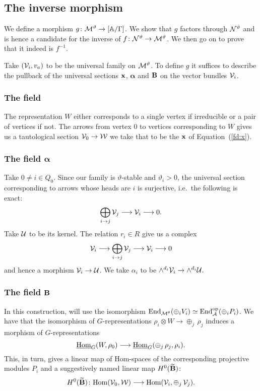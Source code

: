 \documentclass{amsart}
\newcommand{\balpha}{\boldsymbol{\alpha}}
\theoremstyle{definition}
\begin{document}
\subsection{The inverse morphism}

We define a morphism  $g \colon \mathcal{M}^\vartheta \rightarrow [\mathbb{A}/\Gamma]$.
We show that $g$ factors through $\mathcal{N}^\vartheta$ and is hence a candidate for the inverse of $f \colon \mathcal{N}^\vartheta \rightarrow \mathcal{M}^\vartheta$.
We then go on to prove that it indeed is $f^{-1}$.

Take $(\mathcal{V}_i, v_a)$ to be the universal family on $\mathcal{M}^\vartheta$.
To define $g$ it suffices to describe the pullback of the universal sections $\mathbf{x}$, $\balpha$ and $\mathbf{B}$ on the vector bundles $\mathcal{V}_i$.

\subsubsection{The field \bfx}

The representation $W$ either corresponds to a single vertex if irreducible or a pair of vertices if not.
The arrows from vertex $0$ to vertices corresponding to $W$ gives us a tautological section $\mathcal{V}_0 \rightarrow \mathcal{W}$ we take that to be the $\mathbf{x}$ of Equation~(\ref{fd:x}).

\subsubsection{The field $\balpha$}\label{sssc:alpha}

Take $0 \neq i \in Q_0$.
Since our family is $\vartheta$-stable and $\vartheta_i>0$, the universal section corresponding to arrows whose heads are $i$ is surjective, i.e.\ the following is exact:
\begin{equation}\label{eq:k}
    \bigoplus_{i \rightarrow j} \mathcal{V}_j \longrightarrow \mathcal{V}_i \longrightarrow 0.
\end{equation}
Take $\mathcal{U}$ to be its kernel.
The relation $r_i \in R$ give us a complex
$$\mathcal{V}_i \longrightarrow \bigoplus_{i \rightarrow j} \mathcal{V}_j \longrightarrow \mathcal{V}_i \longrightarrow 0$$
and hence a morphism $\mathcal{V}_i \rightarrow \mathcal{U}$.
We take $\alpha_i$ to be $\wedge^{d_i} \mathcal{V}_i \rightarrow \wedge^{d_i}\mathcal{U}.$

\subsubsection{The field $\mathbf{B}$}
In this construction, will use the isomorphism $\operatorname{End}_{\mathcal{M}^\theta}(\oplus_i V_i) \simeq \operatorname{End}^{\text{op}}_{\mathcal{A}}(\oplus_i P_i)$.
We have that the isomorphism of $G$-representations $\rho_i \otimes W \rightarrow \oplus_j\, \rho_j$ induces a morphism of $G$-representations $$\underline{\operatorname{Hom}}_G(W,\rho_0) \longrightarrow \underline{\operatorname{Hom}}_G(\oplus_j \, \rho_j, \rho_i).$$
This, in turn, gives a linear map of Hom-spaces of the corresponding projective modules $P_i$ and a suggestively named linear map $H^0(\widetilde{\mathbf{B}})$:
\begin{equation}\label{eq:homsp}
    H^0(\widetilde{\mathbf{B}}) \colon {\operatorname{Hom}}(\mathcal{V}_0, \mathcal{W}) \longrightarrow {\operatorname{Hom}}(\mathcal{V}_i, \oplus_j \, \mathcal{V}_j).
\end{equation}
\end{document}
